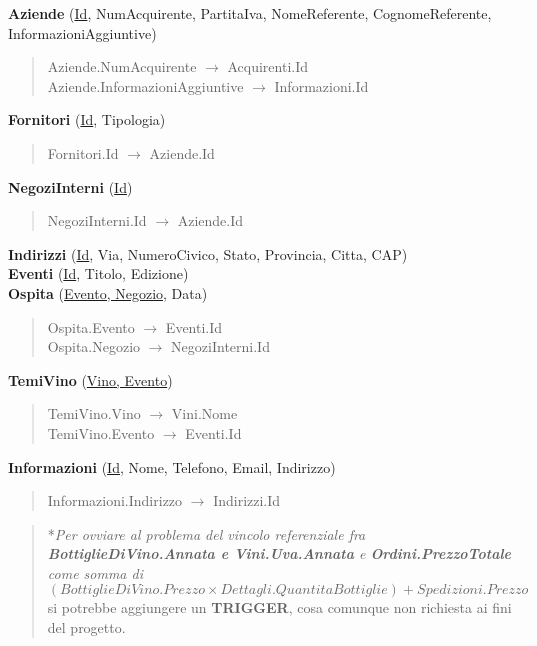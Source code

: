 \textbf{Aziende} (\underline{Id}, NumAcquirente, PartitaIva, NomeReferente, CognomeReferente, InformazioniAggiuntive)
\begin{verse}
	Aziende.NumAcquirente $\to$ Acquirenti.Id\\
	Aziende.InformazioniAggiuntive $\to$ Informazioni.Id
\end{verse}
\textbf{Fornitori} (\underline{Id}, Tipologia)
\begin{verse}
	Fornitori.Id $\to$ Aziende.Id
\end{verse} 
\textbf{NegoziInterni} (\underline{Id})
\begin{verse}
	NegoziInterni.Id $\to$ Aziende.Id
\end{verse} 
\textbf{Indirizzi} (\underline{Id}, Via, NumeroCivico, Stato, Provincia, Citta, CAP)\\
\textbf{Eventi} (\underline{Id}, Titolo, Edizione)\\
\textbf{Ospita} (\underline{Evento, Negozio}, Data)
\begin{verse}
	Ospita.Evento $\to$ Eventi.Id\\
	Ospita.Negozio $\to$ NegoziInterni.Id
\end{verse}  
\textbf{TemiVino} (\underline{Vino, Evento})
\begin{verse}
	TemiVino.Vino $\to$ Vini.Nome\\
	TemiVino.Evento $\to$ Eventi.Id
\end{verse}
\textbf{Informazioni} (\underline{Id}, Nome, Telefono, Email, Indirizzo)
\begin{verse}
	Informazioni.Indirizzo $\to$ Indirizzi.Id
\end{verse}


\begin{verse}
	*\emph{Per ovviare al problema del vincolo referenziale fra \textbf{BottiglieDiVino.Annata e Vini.Uva.Annata} e \textbf{Ordini.PrezzoTotale} come somma di \begin{math}(BottiglieDiVino.Prezzo \times Dettagli.QuantitaBottiglie)+ Spedizioni.Prezzo\end{math}} si potrebbe aggiungere un \textbf{TRIGGER}, cosa comunque non richiesta ai fini del progetto.
\end{verse}